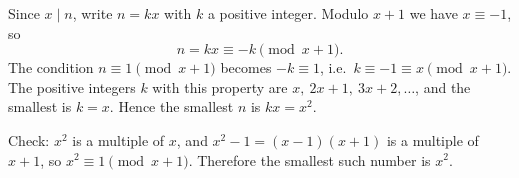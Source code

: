 Since $x\mid n$, write $n=kx$ with $k$ a positive integer. Modulo $x+1$ we have $x\equiv-1$, so
\[
n=kx\equiv-k\pmod{x+1}.
\]
The condition $n\equiv1\pmod{x+1}$ becomes $-k\equiv1$, i.e.\ $k\equiv-1\equiv x\pmod{x+1}$. The positive integers $k$ with this property are $x,\ 2x+1,\ 3x+2,\dots$, and the smallest is $k=x$. Hence the smallest $n$ is $kx=x^2$.

Check: $x^2$ is a multiple of $x$, and $x^2-1=(x-1)(x+1)$ is a multiple of $x+1$, so $x^2\equiv1\pmod{x+1}$. Therefore the smallest such number is $\boxed{x^2}$.

